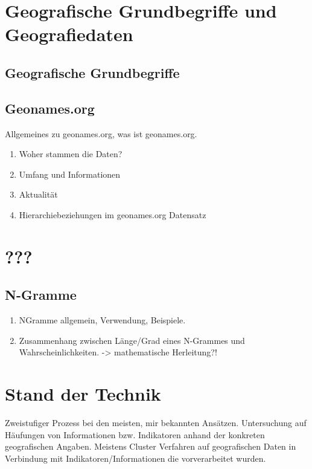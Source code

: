 	
	\section{Geografische Grundbegriffe und Geografiedaten}

		\subsection{Geografische Grundbegriffe}

		\subsection{Geonames.org}
			Allgemeines zu geonames.org, was ist geonames.org. 
			\begin{enumerate}
				\item Woher stammen die Daten?
				\item Umfang und Informationen
				\item Aktualität
				\item Hierarchiebeziehungen im geonames.org Datensatz
			\end{enumerate}	

		\subsection{}	

	\section{???} 
		\subsection{N-Gramme}
			\begin{enumerate}
				\item NGramme allgemein, Verwendung, Beispiele. 
				\item {} Zusammenhang zwischen Länge/Grad eines N-Grammes und Wahrscheinlichkeiten. -> mathematische Herleitung?!
			\end{enumerate}

	\section{Stand der Technik}
		Zweistufiger Prozess bei den meisten, mir bekannten Ansätzen.
		Untersuchung auf Häufungen von Informationen bzw. Indikatoren anhand der konkreten geografischen Angaben. Meistens Cluster Verfahren auf geografischen Daten in Verbindung mit Indikatoren/Informationen die vorverarbeitet wurden.


